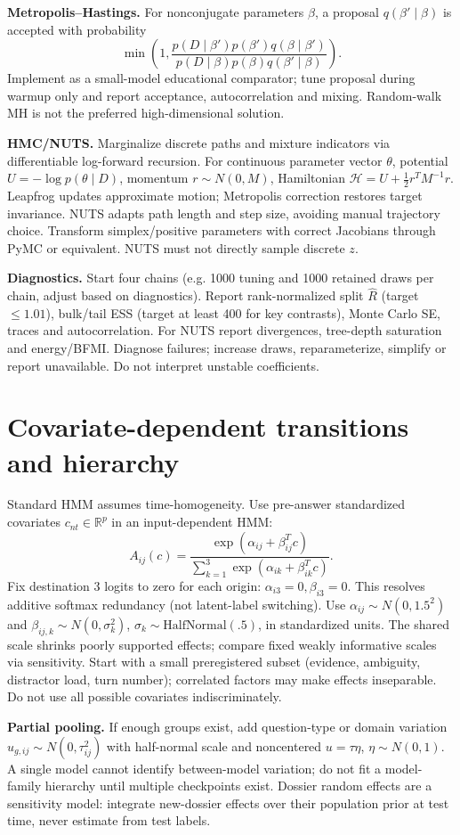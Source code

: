 \documentclass[11pt,letterpaper]{article}
\newcommand{\R}{\mathbb R}
\newcommand{\sectionpage}[1]{\clearpage\section{#1}}
\begin{document}
\textbf{Metropolis--Hastings.} For nonconjugate parameters $\beta$, a proposal $q(\beta'\mid\beta)$ is accepted with probability
\[
\min\left(1,\frac{p(D\mid\beta')p(\beta')q(\beta\mid\beta')}{p(D\mid\beta)p(\beta)q(\beta'\mid\beta)}\right).
\]
Implement as a small-model educational comparator; tune proposal during warmup only and report acceptance, autocorrelation and mixing. Random-walk MH is not the preferred high-dimensional solution.

\textbf{HMC/NUTS.} Marginalize discrete paths and mixture indicators via differentiable log-forward recursion. For continuous parameter vector $\theta$, potential $U=-\log p(\theta\mid D)$, momentum $r\sim N(0,M)$, Hamiltonian $\mathcal H=U+\frac12r^TM^{-1}r$. Leapfrog updates approximate motion; Metropolis correction restores target invariance. NUTS adapts path length and step size, avoiding manual trajectory choice. Transform simplex/positive parameters with correct Jacobians through PyMC or equivalent. NUTS must not directly sample discrete $z$.

\textbf{Diagnostics.} Start four chains (e.g. 1000 tuning and 1000 retained draws per chain, adjust based on diagnostics). Report rank-normalized split $\widehat R$ (target $\le1.01$), bulk/tail ESS (target at least 400 for key contrasts), Monte Carlo SE, traces and autocorrelation. For NUTS report divergences, tree-depth saturation and energy/BFMI. Diagnose failures; increase draws, reparameterize, simplify or report unavailable. Do not interpret unstable coefficients.

\sectionpage{Covariate-dependent transitions and hierarchy}
Standard HMM assumes time-homogeneity. Use pre-answer standardized covariates $c_{nt}\in\R^p$ in an input-dependent HMM:
\[
A_{ij}(c)=\frac{\exp(\alpha_{ij}+\beta_{ij}^Tc)}{\sum_{k=1}^3\exp(\alpha_{ik}+\beta_{ik}^Tc)}.
\]
Fix destination 3 logits to zero for each origin: $\alpha_{i3}=0,\beta_{i3}=0$. This resolves additive softmax redundancy (not latent-label switching). Use $\alpha_{ij}\sim N(0,1.5^2)$ and $\beta_{ij,k}\sim N(0,\sigma_k^2)$, $\sigma_k\sim\mathrm{HalfNormal}(.5)$, in standardized units. The shared scale shrinks poorly supported effects; compare fixed weakly informative scales via sensitivity. Start with a small preregistered subset (evidence, ambiguity, distractor load, turn number); correlated factors may make effects inseparable. Do not use all possible covariates indiscriminately.

\textbf{Partial pooling.} If enough groups exist, add question-type or domain variation $u_{g,ij}\sim N(0,\tau_{ij}^2)$ with half-normal scale and noncentered $u=\tau\eta$, $\eta\sim N(0,1)$. A single model cannot identify between-model variation; do not fit a model-family hierarchy until multiple checkpoints exist. Dossier random effects are a sensitivity model: integrate new-dossier effects over their population prior at test time, never estimate from test labels.
\end{document}
